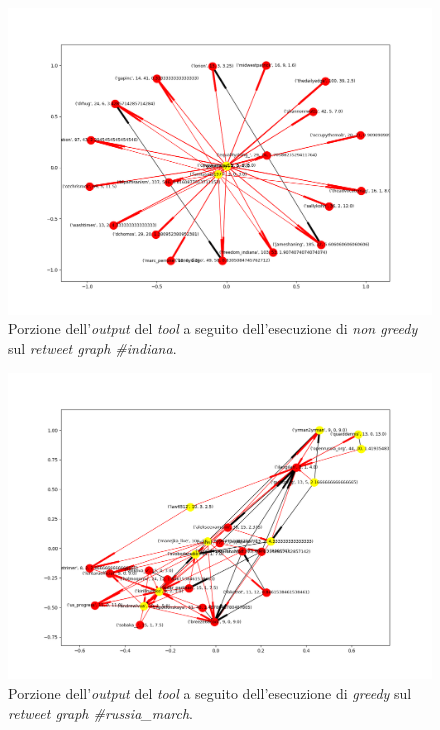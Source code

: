\begin{figure}
\begin{center}
\includegraphics[scale=0.5]{images/indiana_in_degree_probability_free.png}
\end{center}
\caption{Porzione dell'\textit{output} del \textit{tool} a seguito dell'esecuzione di \textit{non greedy} sul \textit{retweet graph \#indiana}.}
\label{fig:indinotgreedy}
\end{figure}

\begin{figure}
\begin{center}
\includegraphics[scale=0.5]{images/russia_march_in_degree_greedy_probability_free.png}
\end{center}
\caption{Porzione dell'\textit{output} del \textit{tool} a seguito dell'esecuzione di \textit{greedy} sul \textit{retweet graph \#russia\_march}.}
\label{fig:russiagreedy}
\end{figure}

